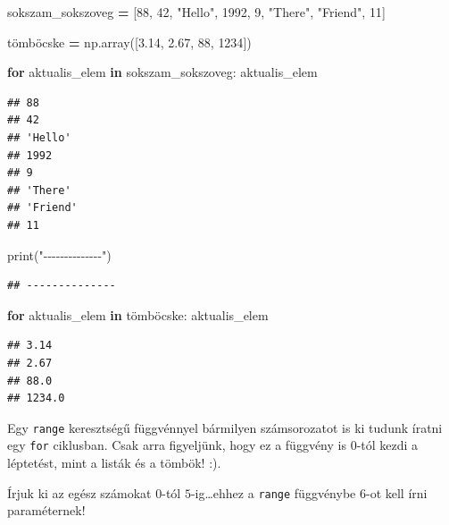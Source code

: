 \documentclass[
]{book}
\newenvironment{Shaded}{\begin{snugshade}}{\end{snugshade}}
\newcommand{\BuiltInTok}[1]{#1}
\newcommand{\ControlFlowTok}[1]{\textcolor[rgb]{0.13,0.29,0.53}{\textbf{#1}}}
\newcommand{\DecValTok}[1]{\textcolor[rgb]{0.00,0.00,0.81}{#1}}
\newcommand{\FloatTok}[1]{\textcolor[rgb]{0.00,0.00,0.81}{#1}}
\newcommand{\KeywordTok}[1]{\textcolor[rgb]{0.13,0.29,0.53}{\textbf{#1}}}
\newcommand{\NormalTok}[1]{#1}
\newcommand{\OperatorTok}[1]{\textcolor[rgb]{0.81,0.36,0.00}{\textbf{#1}}}
\newcommand{\StringTok}[1]{\textcolor[rgb]{0.31,0.60,0.02}{#1}}
\begin{document}
\begin{Shaded}
\begin{Highlighting}[]
\NormalTok{sokszam\_sokszoveg }\OperatorTok{=}\NormalTok{ [}\DecValTok{88}\NormalTok{, }\DecValTok{42}\NormalTok{, }\StringTok{"Hello"}\NormalTok{, }\DecValTok{1992}\NormalTok{, }\DecValTok{9}\NormalTok{, }\StringTok{"There"}\NormalTok{, }\StringTok{"Friend"}\NormalTok{, }\DecValTok{11}\NormalTok{]}

\NormalTok{tömböcske }\OperatorTok{=}\NormalTok{ np.array([}\FloatTok{3.14}\NormalTok{, }\FloatTok{2.67}\NormalTok{, }\DecValTok{88}\NormalTok{, }\DecValTok{1234}\NormalTok{])}

\ControlFlowTok{for}\NormalTok{ aktualis\_elem }\KeywordTok{in}\NormalTok{ sokszam\_sokszoveg:}
\NormalTok{  aktualis\_elem}
\end{Highlighting}
\end{Shaded}

\begin{verbatim}
## 88
## 42
## 'Hello'
## 1992
## 9
## 'There'
## 'Friend'
## 11
\end{verbatim}

\begin{Shaded}
\begin{Highlighting}[]
\BuiltInTok{print}\NormalTok{(}\StringTok{"{-}{-}{-}{-}{-}{-}{-}{-}{-}{-}{-}{-}{-}{-}"}\NormalTok{)}
\end{Highlighting}
\end{Shaded}

\begin{verbatim}
## --------------
\end{verbatim}

\begin{Shaded}
\begin{Highlighting}[]
\ControlFlowTok{for}\NormalTok{ aktualis\_elem }\KeywordTok{in}\NormalTok{ tömböcske:}
\NormalTok{  aktualis\_elem}
\end{Highlighting}
\end{Shaded}

\begin{verbatim}
## 3.14
## 2.67
## 88.0
## 1234.0
\end{verbatim}

Egy \texttt{range} keresztségű függvénnyel bármilyen számsorozatot is ki tudunk íratni egy \texttt{for} ciklusban. Csak arra figyeljünk, hogy ez a függvény is 0-tól kezdi a léptetést, mint a listák és a tömbök! :).

Írjuk ki az egész számokat \(0\)-tól \(5\)-ig\ldots ehhez a \texttt{range} függvénybe \(6\)-ot kell írni paraméternek!
\end{document}
